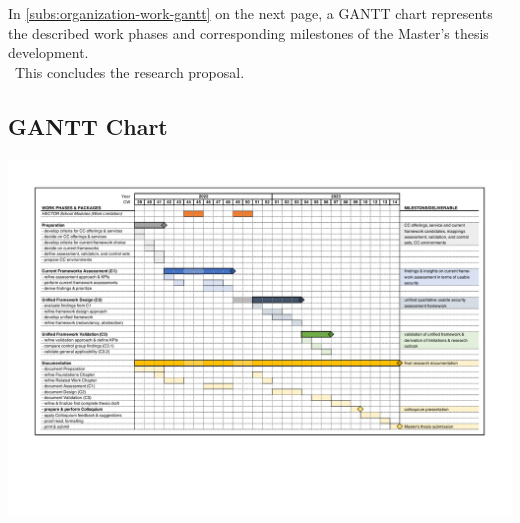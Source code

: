 	In \autoref{subs:organization-work-gantt} on the next page, a  GANTT chart represents the described work phases and corresponding milestones of the Master's thesis development. 	\\\ This concludes the research proposal.
	
	\subsection{GANTT Chart} \label{subs:organization-work-gantt}
	\begin{center}
		\vfill
		\includegraphics[angle=90,scale=0.58]{content/2-research-proposal/img/gantt.pdf}
		\vfill
	\end{center}
	\newpage